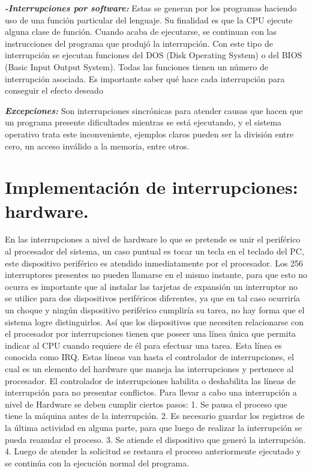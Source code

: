 \documentclass{article}
\begin{document}
\textbf{\textit{-Interrupciones por software:}} Estas se generan por los programas haciendo uso de una función particular del lenguaje. Su finalidad es que la CPU ejecute alguna clase de función. Cuando acaba de ejecutarse, se continuan con las instrucciones  del programa que produjó la interrupción. Con este tipo de interrupción se ejecutan funciones del DOS (Disk Operating System) o del BIOS (Basic Input Output System). Todas las funciones tienen un número de interrupción asociada. Es importante saber qué hace cada interrupción para conseguir el efecto deseado

\textbf{\textit{Excepciones:}} Son interrupciones sincrónicas para atender causas que hacen que un programa presente dificultades mientras se está ejecutando, y el sistema operativo trata este inconveniente, ejemplos claros pueden ser la división entre cero, un acceso inválido a la memoria, entre otros.

\section{Implementación de interrupciones: hardware.}\cite{Profesor}
En las interrupciones a nivel de hardware lo que se pretende es unir el periférico al procesador del sistema, un caso puntual es tocar un tecla en el teclado del PC, este dispositivo periférico es atendido inmediatamente por el procesador. Los 256 interruptores presentes no pueden llamarse en el mismo instante, para que esto no ocurra es importante que al instalar las tarjetas de expansión un interruptor no se utilice para dos dispositivos periféricos diferentes, ya que en tal caso ocurriría un choque y ningún dispositivo periférico cumpliría su tarea, no hay forma que el sistema logre distinguirlos. Así que los dispositivos que necesiten relacionarse con el procesador por interrupciones tienen que poseer una línea única que permita indicar al CPU cuando requiere de él para efectuar una tarea. Esta línea es conocida como IRQ. Estas líneas van hasta el controlador de interrupciones, el cual es un elemento del hardware que maneja las interrupciones y pertenece al procesador. El controlador de interrupciones habilita o deshabilita las líneas de interrupción para no presentar conflictos.
Para llevar a cabo una interrupción a nivel de Hardware se deben cumplir ciertos pasos:
1.	Se pausa el proceso que tiene la máquina antes de la interrupción.
2.	Es necesario guardar los registros de la última actividad en alguna parte, para que luego de realizar la interrupción se pueda reanudar el proceso.
3.	Se atiende el dispositivo que generó la interrupción.
4.	Luego de atender la solicitud se restaura el proceso anteriormente ejecutado y se continúa con la ejecución normal del programa.
\end{document}
